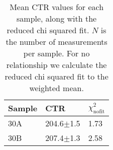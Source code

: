 \begin{table}
\caption{Mean CTR values for each sample, along with the reduced chi squared fit. $N$ is the number of measurements per sample. For no relationship we calculate the reduced chi squared fit to the weighted mean.}
\label{tab:doiresults-ProteusUnwrapped}
\begin{tabular}{lll}
\toprule
Sample &            CTR &   $\chi^2_\text{nofit}$ \\
\midrule
   30A &  204.6$\pm$1.5 &  1.73 \\
   30B &  207.4$\pm$1.3 &  2.58 \\
\bottomrule
\end{tabular}
\end{table}
